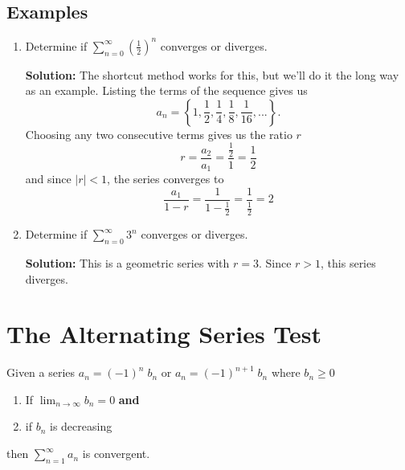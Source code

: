 \documentclass[12pt]{report}
\begin{document}
\subsection*{Examples}

\begin{enumerate}
    \item Determine if $\sum_{n=0}^{\infty} \left( \frac{1}{2} \right)^n$ converges or diverges.
    
    \textbf{Solution:} The shortcut method works for this, but we'll do it the long way as an example. Listing the terms of the sequence gives us
        $$a_n = \left\{1, \frac{1}{2}, \frac{1}{4}, \frac{1}{8}, \frac{1}{16}, ... \right\}.$$
    Choosing any two consecutive terms gives us the ratio $r$
        $$r= \frac{a_2}{a_1} = \frac{\frac{1}{2}}{1} = \frac{1}{2}$$
    and since $|r| < 1$, the series converges to 
        $$\frac{a_1}{1-r} = \frac{1}{1-\frac{1}{2}} = \frac{1}{\frac{1}{2}} = 2$$
    
    
    
        
    \item Determine if $\sum_{n=0}^{\infty} 3^n$ converges or diverges. 
    
    \textbf{Solution:} This is a geometric series with $r = 3$. Since $r > 1$, this series diverges.
\end{enumerate}



\section{The Alternating Series Test}
Given a series $a_n = (-1)^n \; b_n $ or $ a_n = (-1)^{n+1} \; b_n $ where $ b_n \geq 0 $

\begin{enumerate}
	\item If $ \lim_{n\to\infty} b_n = 0 $ \textbf{and}
	\item if $ b_n $ is decreasing
\end{enumerate}

\noindent then $ \sum_{n=1}^{\infty} a_n $ is convergent.
\end{document}
